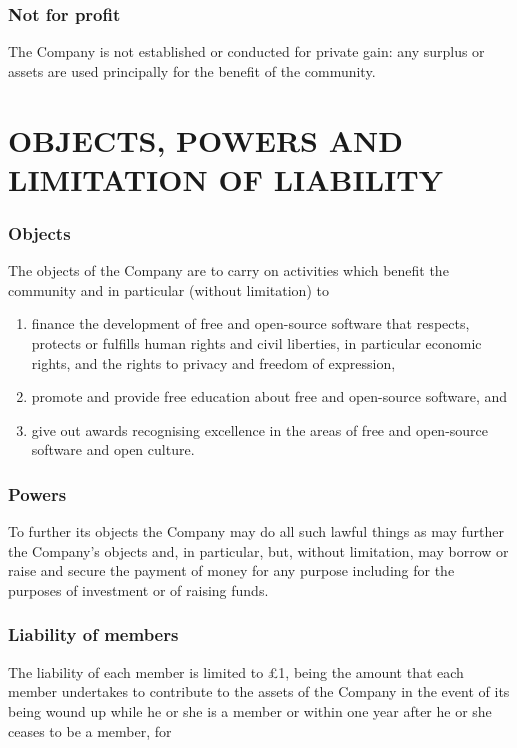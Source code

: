 \documentclass[a4paper,12pt]{article}
\renewcommand{\labelenumi}{\thesection.\arabic{enumi}}
\begin{document}
\section{Not for profit}

The Company is not established or conducted for private gain: any surplus or assets are used principally for the benefit of the community.

\part*{OBJECTS, POWERS AND LIMITATION OF LIABILITY}

\section{Objects}

The objects of the Company are to carry on activities which benefit the community and in particular (without limitation) to

\begin{enumerate}
  \renewcommand{\labelenumi}{(\alph{enumi})}
  \item finance the development of free and open-source software that respects, protects or fulfills human rights and civil liberties, in particular economic rights, and the rights to privacy and freedom of expression,
  \item promote and provide free education about free and open-source software, and
  \item give out awards recognising excellence in the areas of free and open-source software and open culture.
\end{enumerate}

\section{Powers}

To further its objects the Company may do all such lawful things as may further the Company’s objects and, in particular, but, without limitation, may borrow or raise and secure the payment of money for any purpose including for the purposes of investment or of raising funds.

\section{Liability of members}


The liability of each member is limited to £1, being the amount that each member undertakes to contribute to the assets of the Company in the event of its being wound up while he or she is a member or within one year after he or she ceases to be a member, for
\end{document}
